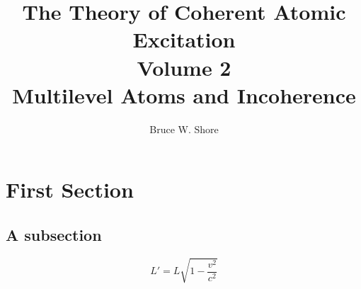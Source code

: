 \documentclass{book}
\author{Bruce W. Shore}
\title{The Theory of Coherent Atomic Excitation\\Volume 2\\Multilevel Atoms and Incoherence}
\numberwithin{equation}{subsection}
\begin{document}
 \section{First Section}

 \subsection{A subsection}
 \begin{equation}
  L' = {L}{\sqrt{1-\frac{v^2}{c^2}}}
 \end{equation}
\end{document}
